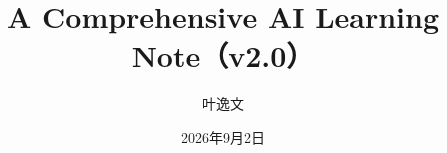 
\title{A Comprehensive AI Learning Note（v2.0）}
\author{叶逸文}
\date{2026年9月2日}


\makeatletter
\begin{titlepage}
\centering
\vspace*{0.18\textheight}
{\color{latexprojectBlue}\resizebox{0.92\textwidth}{!}{\bfseries\@title}\par}
\vspace{2.2em}
{\Large\@author\par}
\vfill
{\large\@date\par}
\end{titlepage}
\makeatother
\frontmatter
{}
{}
\tableofcontents


